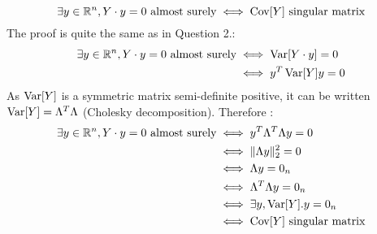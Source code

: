 \begin{solution}
\begin{enumerate}
          \[
            \exists y\in \mathbb{R}^n, Y \cdot y = 0 \text{ almost surely} \iff \operatorname{Cov}[Y] \text{ singular matrix}
          \]
          The proof is quite the same as in Question 2.:
          \begin{align*}
            \exists y\in \mathbb{R}^n, Y \cdot y = 0  \text{ almost surely} & \iff \operatorname{Var}[Y \cdot y] = 0 \\
                                                                    & \iff y^T \operatorname{Var}[Y] y = 0   \\
          \end{align*}
          As $\operatorname{Var}[Y]$ is a symmetric matrix semi-definite positive, it can be written $\operatorname{Var}[Y] = \Lambda^T \Lambda$ (Cholesky decomposition). Therefore :
          \begin{align*}
            \exists y\in \mathbb{R}^n, Y \cdot y = 0  \text{ almost surely} & \iff y^T \Lambda^T \Lambda y = 0     \\
                                                                    & \iff \|\Lambda y\|_2^2 = 0           \\
                                                                    & \iff \Lambda y = 0_n                 \\
                                                                    & \iff \Lambda^T \Lambda y = 0_n       \\
                                                                    & \iff \exists y, \operatorname{Var}[Y] . y = 0_n    \\
                                                                    & \iff \operatorname{Cov}[Y] \text{ singular matrix}
          \end{align*}
  \end{enumerate}
\end{solution}